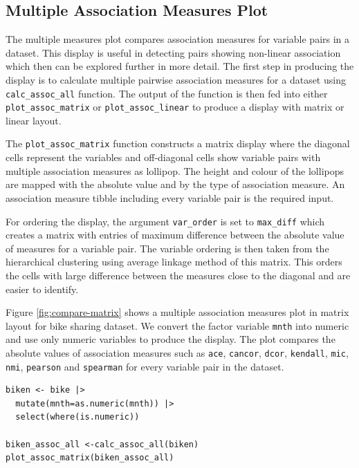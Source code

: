 \hypertarget{multiple-association-measures-plot}{%
\subsection{Multiple Association Measures Plot}\label{multiple-association-measures-plot}}

The multiple measures plot compares association measures for variable pairs in a dataset. This display is useful in detecting pairs showing non-linear association which then can be explored further in more detail. The first step in producing the display is to calculate multiple pairwise association measures for a dataset using \texttt{calc\_assoc\_all} function. The output of the function is then fed into either \texttt{plot\_assoc\_matrix} or \texttt{plot\_assoc\_linear} to produce a display with matrix or linear layout.

The \texttt{plot\_assoc\_matrix} function constructs a matrix display where the diagonal cells represent the variables and off-diagonal cells show variable pairs with multiple association measures as lollipop. The height and colour of the lollipops are mapped with the absolute value and by the type of association measure. An association measure tibble including every variable pair is the required input.

For ordering the display, the argument \texttt{var\_order} is set to \texttt{max\_diff} which creates a matrix with entries of maximum difference between the absolute value of measures for a variable pair. The variable ordering is then taken from the hierarchical clustering using average linkage method of this matrix. This orders the cells with large difference between the measures close to the diagonal and are easier to identify.

Figure \ref{fig:compare-matrix} shows a multiple association measures plot in matrix layout for bike sharing dataset. We convert the factor variable \texttt{mnth} into numeric and use only numeric variables to produce the display. The plot compares the absolute values of association measures such as \texttt{ace}, \texttt{cancor}, \texttt{dcor}, \texttt{kendall}, \texttt{mic}, \texttt{nmi}, \texttt{pearson} and \texttt{spearman} for every variable pair in the dataset.

\begin{verbatim}
biken <- bike |>
  mutate(mnth=as.numeric(mnth)) |>
  select(where(is.numeric))

biken_assoc_all <-calc_assoc_all(biken)
plot_assoc_matrix(biken_assoc_all) 
\end{verbatim}

